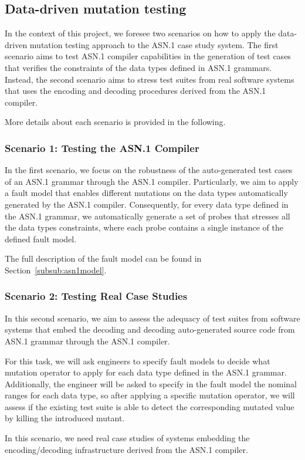 \subsection{Data-driven mutation testing}

In the context of this project, we foresee two scenarios on how to apply the data-driven mutation testing approach to the ASN.1 case study system. 
The first scenario aims to test ASN.1 compiler capabilities in the generation of test cases that verifies the constraints of the data types defined in ASN.1 grammars.
Instead, the second scenario aims to stress test suites from real software systems that uses the encoding and decoding procedures derived from the ASN.1 compiler.

More details about each scenario is provided in the following.

\subsubsection{Scenario 1: Testing the ASN.1 Compiler}

In the first scenario, we focus on the robustness of the auto-generated test cases of an ASN.1 grammar through the ASN.1 compiler.
Particularly, we aim to apply a fault model that enables different mutations on the data types automatically generated by the ASN.1 compiler. Consequently, for every data type defined in the ASN.1 grammar, we automatically generate a set of probes that stresses all the data types constraints, where each probe contains a single instance of the defined fault model.

The full description of the fault model can be found in Section~\ref{subsub:asn1model}.

\subsubsection{Scenario 2: Testing Real Case Studies}

In this second scenario, we aim to assess the adequacy of test suites from software systems that embed the decoding and decoding auto-generated source code from ASN.1 grammar through the ASN.1 compiler.

For this task, we will ask engineers to specify fault models to decide what mutation operator to apply for each data type defined in the ASN.1 grammar.
Additionally, the engineer will be asked to specify in the fault model the nominal ranges for each data type, so after applying a specific mutation operator, we will assess if the existing test suite is able to detect the corresponding mutated value by killing the introduced mutant.

In this scenario, we need real case studies of systems embedding the encoding/decoding infrastructure derived from the ASN.1 compiler. 


